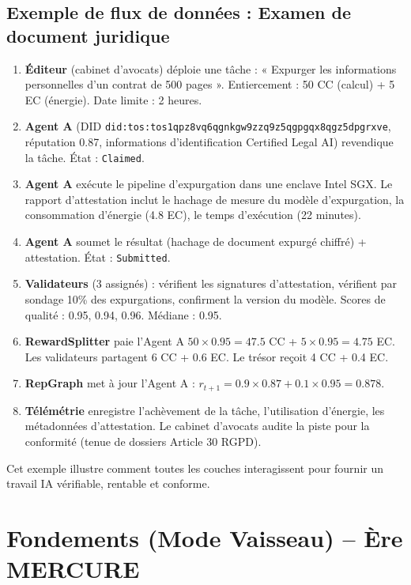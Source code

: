 \documentclass[11pt]{article}
\begin{document}
\subsection{Exemple de flux de données : Examen de document juridique}
\begin{enumerate}[label=\arabic*.]
  \item \textbf{Éditeur} (cabinet d'avocats) déploie une tâche : « Expurger les informations personnelles d'un contrat de 500 pages ». Entiercement : 50 CC (calcul) + 5 EC (énergie). Date limite : 2 heures.
  \item \textbf{Agent A} (DID \texttt{did:tos:tos1qpz8vq6qgnkgw9zzq9z5qgpgqx8qgz5dpgrxve}, réputation 0.87, informations d'identification Certified Legal AI) revendique la tâche. État : \texttt{Claimed}.
  \item \textbf{Agent A} exécute le pipeline d'expurgation dans une enclave Intel SGX. Le rapport d'attestation inclut le hachage de mesure du modèle d'expurgation, la consommation d'énergie (4.8 EC), le temps d'exécution (22 minutes).
  \item \textbf{Agent A} soumet le résultat (hachage de document expurgé chiffré) + attestation. État : \texttt{Submitted}.
  \item \textbf{Validateurs} (3 assignés) : vérifient les signatures d'attestation, vérifient par sondage 10\% des expurgations, confirment la version du modèle. Scores de qualité : 0.95, 0.94, 0.96. Médiane : 0.95.
  \item \textbf{RewardSplitter} paie l'Agent A $50 \times 0.95 = 47.5$ CC + $5 \times 0.95 = 4.75$ EC. Les validateurs partagent 6 CC + 0.6 EC. Le trésor reçoit 4 CC + 0.4 EC.
  \item \textbf{RepGraph} met à jour l'Agent A : $r_{t+1} = 0.9 \times 0.87 + 0.1 \times 0.95 = 0.878$.
  \item \textbf{Télémétrie} enregistre l'achèvement de la tâche, l'utilisation d'énergie, les métadonnées d'attestation. Le cabinet d'avocats audite la piste pour la conformité (tenue de dossiers Article 30 RGPD).
\end{enumerate}

Cet exemple illustre comment toutes les couches interagissent pour fournir un travail IA vérifiable, rentable et conforme.

\section{Fondements (Mode Vaisseau) -- Ère MERCURE}
\end{document}
